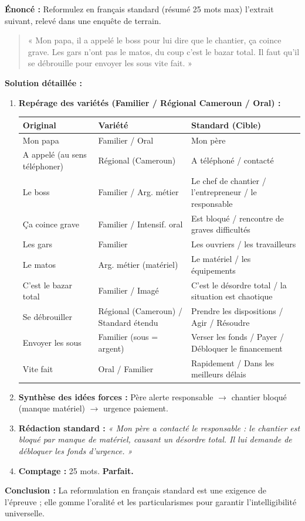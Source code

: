 \documentclass[11pt]{article}
\begin{document}
\begin{exoresolu}
\textbf{Énoncé :} Reformulez en français standard (résumé 25 mots max) l'extrait suivant, relevé dans une enquête de terrain.
\begin{quote}
« Mon papa, il a appelé le boss pour lui dire que le chantier, ça coince grave. Les gars n'ont pas le matos, du coup c'est le bazar total. Il faut qu'il se débrouille pour envoyer les sous vite fait. »
\end{quote}
\tcblower
\textbf{Solution détaillée :}
\begin{enumerate}
    \item \textbf{Repérage des variétés (Familier / Régional Cameroun / Oral) :}
    \begin{center}
    \begin{tabularx}{\linewidth}{|l|X|X|}\hline
    \textbf{Original} & \textbf{Variété} & \textbf{Standard (Cible)} \\ \hline
    Mon papa & Familier / Oral & Mon père \\ \hline
    A appelé (au sens téléphoner) & Régional (Cameroun) & A téléphoné / contacté \\ \hline
    Le boss & Familier / Arg. métier & Le chef de chantier / l'entrepreneur / le responsable \\ \hline
    Ça coince grave & Familier / Intensif. oral & Est bloqué / rencontre de graves difficultés \\ \hline
    Les gars & Familier & Les ouvriers / les travailleurs \\ \hline
    Le matos & Arg. métier (matériel) & Le matériel / les équipements \\ \hline
    C'est le bazar total & Familier / Imagé & C'est le désordre total / la situation est chaotique \\ \hline
    Se débrouiller & Régional (Cameroun) / Standard étendu & Prendre les dispositions / Agir / Résoudre \\ \hline
    Envoyer les sous & Familier (sous = argent) & Verser les fonds / Payer / Débloquer le financement \\ \hline
    Vite fait & Oral / Familier & Rapidement / Dans les meilleurs délais \\ \hline
    \end{tabularx}
    \end{center}
    \item \textbf{Synthèse des idées forces :} Père alerte responsable $\rightarrow$ chantier bloqué (manque matériel) $\rightarrow$ urgence paiement.
    \item \textbf{Rédaction standard :}
    \emph{« Mon père a contacté le responsable : le chantier est bloqué par manque de matériel, causant un désordre total. Il lui demande de débloquer les fonds d'urgence. »}
    \item \textbf{Comptage :} 25 mots. \textbf{Parfait.}
\end{enumerate}
\textbf{Conclusion :} La reformulation en français standard est une exigence de l'épreuve ; elle gomme l'oralité et les particularismes pour garantir l'intelligibilité universelle.
\end{exoresolu}
\end{document}

